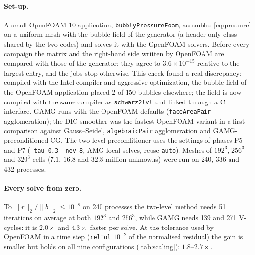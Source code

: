 \documentclass[11pt,a4paper]{article}
\begin{document}
\paragraph{Set-up.} A small OpenFOAM-10 application, \texttt{bubblyPressureFoam}, assembles
\eqref{eq:pressure} on a uniform mesh with the bubble field of the generator (a header-only class shared by the
two codes) and solves it with the OpenFOAM solvers. Before every campaign the matrix and the right-hand side
written by OpenFOAM are compared with those of the generator: they agree to $3.6\times10^{-15}$ relative to the
largest entry, and the jobs stop otherwise. This check found a real discrepancy: compiled with the Intel
compiler and aggressive optimization, the bubble field of the OpenFOAM application placed 2 of 150 bubbles
elsewhere; the field is now compiled with the same compiler as \texttt{schwarz2lvl} and linked through a C
interface. GAMG runs with the OpenFOAM defaults (\texttt{faceAreaPair} agglomeration); the DIC smoother was the
fastest OpenFOAM variant in a first comparison against Gauss--Seidel, \texttt{algebraicPair} agglomeration and
GAMG-preconditioned CG. The two-level preconditioner uses the settings of phases P5 and P7 (\texttt{--tau 0.3
--nev 8}, AMG local solves, reuse \texttt{auto}). Meshes of $192^3$, $256^3$ and $320^3$ cells
($7.1$, $16.8$ and $32.8$ million unknowns) were run on 240, 336 and 432 processes.

\paragraph{Every solve from zero.} To $\|r\|_2/\|b\|_2\leq10^{-8}$ on 240 processes the two-level method
needs 51 iterations on average at both $192^3$ and $256^3$, while GAMG needs 139 and 271 V-cycles: it is
$2.0\times$ and $4.3\times$ faster per solve. At the tolerance used by OpenFOAM in a time step
(\texttt{relTol} $10^{-2}$ of the normalised residual) the gain is smaller but holds on all nine
configurations (\cref{tab:scaling}): $1.8$--$2.7\times$.
\end{document}
